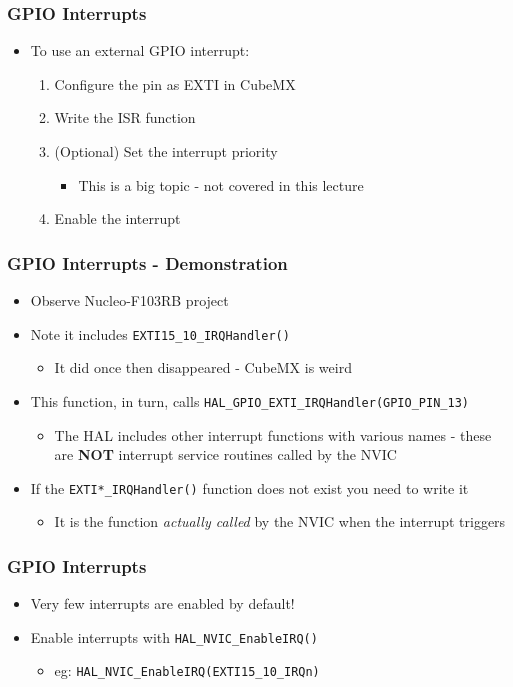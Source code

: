 \documentclass[14pt]{beamer}
\begin{document}
\begin{frame}[fragile]
\frametitle{GPIO Interrupts}
\begin{itemize}
\item To use an external GPIO interrupt:
	\begin{enumerate}
		\item Configure the pin as EXTI in CubeMX
		\item Write the ISR function
		\item (Optional) Set the interrupt priority
			\begin{itemize}
				\item This is a big topic - not covered in this lecture
			\end{itemize}
		\item Enable the interrupt
	\end{enumerate}
\end{itemize}
\end{frame}

\begin{frame}[fragile]
\frametitle{GPIO Interrupts - Demonstration}
\begin{itemize}
\item Observe Nucleo-F103RB project
\item Note it includes \texttt{EXTI15\_10\_IRQHandler()}
	\begin{itemize}
		\item It did once then disappeared - CubeMX is weird
	\end{itemize}
\item This function, in turn, calls \texttt{HAL\_GPIO\_EXTI\_IRQHandler(GPIO\_PIN\_13)}
\begin{itemize}
	\item The HAL includes other interrupt functions with various names - these are \textbf{NOT} interrupt service routines called by the NVIC
\end{itemize}
\item If the \texttt{EXTI*\_IRQHandler()} function does not exist you need to write it
	\begin{itemize}
		\item It is the function \textit{actually called} by the NVIC when the interrupt triggers
	\end{itemize}
\end{itemize}
\end{frame}

\begin{frame}[fragile]
\frametitle{GPIO Interrupts}
\begin{itemize}
\item Very few interrupts are enabled by default!
\item Enable interrupts with \texttt{HAL\_NVIC\_EnableIRQ()}
	\begin{itemize}
		\item eg: \texttt{HAL\_NVIC\_EnableIRQ(EXTI15\_10\_IRQn)}
	\end{itemize}
\end{itemize}
\end{frame}
\end{document}
